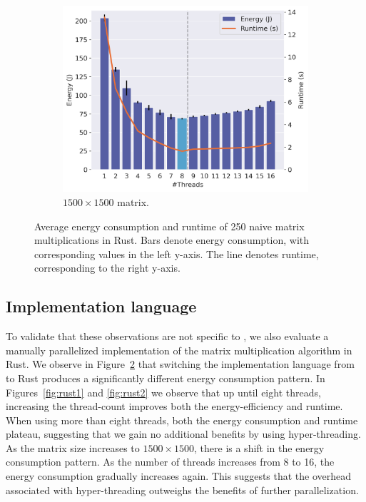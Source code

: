 \begin{figure}[!ht]
\begin{subfigure}{0.33\linewidth}
        \includegraphics[width=\linewidth]{images/rust_1500.png}
        \caption{$1500 \times 1500$ matrix.}
        \label{fig:rust3}
    \end{subfigure}%
    \caption{Average energy consumption and runtime of 250 naive matrix multiplications in Rust.
    Bars denote energy consumption, with corresponding values in the left y-axis.
    The line denotes runtime, corresponding to the right y-axis.}
    \label{fig:rust}
\end{figure}

\subsection{Implementation language}

To validate that these observations are not specific to \sac{}, we also evaluate a manually
parallelized implementation of the matrix multiplication algorithm in Rust. We observe in
Figure~\ref{fig:rust} that switching the implementation language from \sac{} to Rust produces a
significantly different energy consumption pattern. In Figures~\ref{fig:rust1} and \ref{fig:rust2}
we observe that up until eight threads, increasing the thread-count improves both the
energy-efficiency and runtime. When using more than eight threads, both the energy consumption and
runtime plateau, suggesting that we gain no additional benefits by using hyper-threading. As the
matrix size increases to $1500 \times 1500$, there is a shift in the energy consumption pattern. As
the number of threads increases from 8 to 16, the energy consumption gradually increases again. This
suggests that the overhead associated with hyper-threading outweighs the benefits of further
parallelization.

